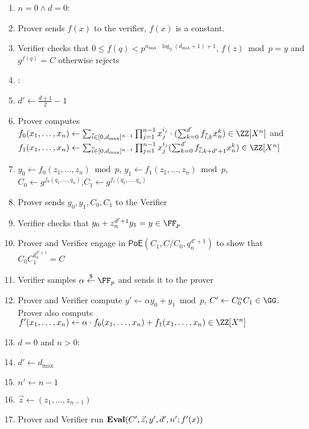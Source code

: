 \documentclass{article}
\begin{document}
\begin{small}
\begin{minipage}{1.1\textwidth}
\begin{mdframed}[userdefinedwidth=1\textwidth]
\begin{enumerate}[nolistsep]
\item \pcif $n=0 \wedge d=0$:
\item \pcind[1] Prover sends $f(x)$ to the verifier, $f(x)$ is a constant. 
\item \pcind[1] Verifier checks that $0\leq f(q)< p^{n_{\max}\cdot \log_2(d_{\max}+1)+1}$,  $f(z) \bmod p=y$ and $g^{f(q)}=C$ otherwise rejects
\item \pcelse: 
\item \pcind[1] $d'\gets \frac{d+1}{2}-1$
\item \pcind[1] Prover computes $f_0(x_1,\dots,x_n)\gets \sum_{\vec{i} \in [0,d_{\max}]^{n-1}}  \prod_{j=1}^{n-1} x_{j}^{i_j} \cdot(\sum_{k=0}^{d'} f_{\vec{i},k} x_{n}^k)\in \ZZ[X^n]$ and
$f_1(x_1,\dots,x_n)\gets \sum_{\vec{i} \in [0,d_{\max}]^{n-1}} \prod_{j=1}^{n-1} x_{j}^{i_j}(  \sum_{k=0}^{d'} f_{\vec{i},k+d'+1} x_{n}^{k})\in \ZZ[X^n]$
\item \pcind[1] $y_0\gets f_0(z_1,\dots,z_n) \bmod p$, $y_1\gets f_1(z_1,\dots,z_n)\bmod p$,\\ $C_0\gets g^{f_0(q_1,\dots,q_n)}$,$C_1\gets g^{f_1(q_1,\dots,q_n)}$
\item \pcind[1] Prover sends $y_0,y_1,C_0,C_1$ to the Verifier
\item \pcind[1] Verifier checks that $y_0+z_n^{d'+1} y_1=y\in \FF_p$ 
\item \pcind[1] Prover and Verifier engage in $\textsf{PoE}(C_1,C/C_0,q_n^{d'+1})$ to show that $C_0C_1^{q_n^{d'+1}}=C$
\item \pcind[1] Verifier samples $\alpha \sample \FF_p$ and sends it to the prover
\item \pcind[1] Prover and Verifier compute $y'\gets\alpha y_0 +y_1 \bmod p$, $C'\gets C_0^{\alpha}C_1 \in \GG$. \\Prover also computs $f'(x_1,\dots,x_n)\gets\alpha  \cdot f_0(x_1,\dots,x_n)+f_1(x_1,\dots,x_n) \in \ZZ[X^n]$ 
\item \pcind[1] \pcif $d=0$ and $n>0$: 
\item \pcind[2] $d'\gets d_{\max}$
\item \pcind[2] $n'\gets n-1$
\item \pcind[2] $\vec{z}\gets (z_1,\dots,z_{n-1})$
\item \pcind[1] Prover and Verifier run $\textbf{{Eval}}(C',\vec{z},y',d',n';f'(x))$
\end{enumerate}
\end{mdframed}
\end{minipage}
\end{small}
\end{document}
